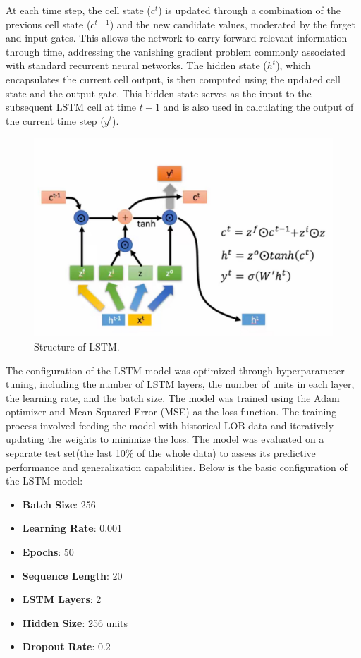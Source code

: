 \documentclass[conference]{IEEEtran}
\begin{document}
At each time step, the cell state (\( c^t \)) is updated through a combination of the previous cell state (\( c^{t-1} \)) and the new candidate values, moderated by the forget and input gates. This allows the network to carry forward relevant information through time, addressing the vanishing gradient problem commonly associated with standard recurrent neural networks. The hidden state (\( h^t \)), which encapsulates the current cell output, is then computed using the updated cell state and the output gate. This hidden state serves as the input to the subsequent LSTM cell at time \( t+1 \) and is also used in calculating the output of the current time step (\( y^t \)).


\begin{figure}[!ht]
\begin{center}
\includegraphics[width=\linewidth]{./img/lstm_structure.png} 
\caption{Structure of LSTM.}
\label{fig.1}
\end{center}
\end{figure}

The configuration of the LSTM model was optimized through hyperparameter tuning, including the number of LSTM layers, the number of units in each layer, the learning rate, and the batch size. The model was trained using the Adam optimizer and Mean Squared Error (MSE) as the loss function. The training process involved feeding the model with historical LOB data and iteratively updating the weights to minimize the loss.
The model was evaluated on a separate test set(the last 10\% of the whole data) to assess its predictive performance and generalization capabilities.
Below is the basic configuration of the LSTM model:
\begin{itemize}
    \item \textbf{Batch Size}: 256
    \item \textbf{Learning Rate}: 0.001
    \item \textbf{Epochs}: 50
    \item \textbf{Sequence Length}: 20
    \item \textbf{LSTM Layers}: 2
    \item \textbf{Hidden Size}: 256 units
    \item \textbf{Dropout Rate}: 0.2
\end{itemize}
\end{document}
